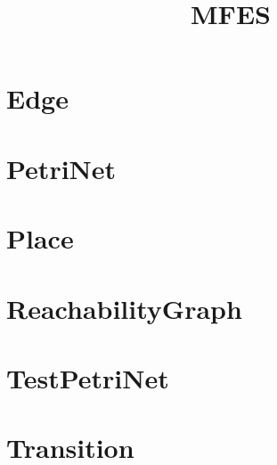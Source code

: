 \documentclass{article}
\begin{document}
\title{MFES}
\author{}
\maketitle
\tableofcontents

\section{Edge}

\section{PetriNet}

\section{Place}

\section{ReachabilityGraph}

\section{TestPetriNet}

\section{Transition}

\end{document}
